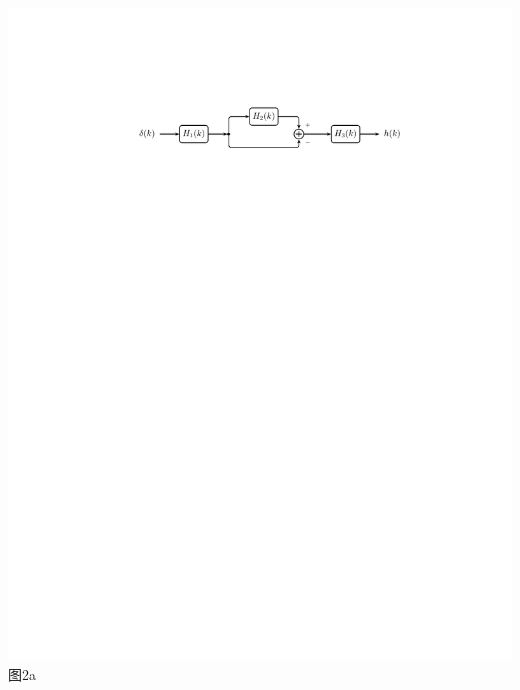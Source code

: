 \documentclass[11pt,twoside]{ctexart}
\begin{document}
\begin{enumerate}[leftmargin=0em]
\begin{center}
\includegraphics{img/6.pdf}\\
图2a\\

\end{center}
\end{enumerate}
\end{document}

